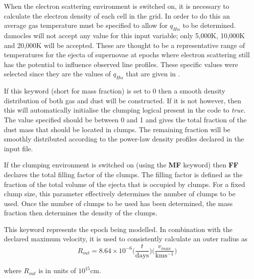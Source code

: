 
 When the electron scattering environment is switched on, it is necessary to calculate the electron density of each cell in the grid.  In order to do this an average gas temperature must be specified to allow for $q_{H\alpha}$ to be determined.  {\sc damocles} will not accept any value for this input variable; only 5,000K, 10,000K and 20,000K will be accepted.  These are thought to be a representative range of temperatures for the ejecta of supernovae at epochs where electron scattering still has the potential to influence observed line profiles.  These specific values were selected since they are the values of $q_{H\alpha}$ that are given in \citet{Osterbrock2006}.


 If this keyword (short for mass fraction) is set to 0 then a smooth density distribution of both gas and dust will be constructed.   If it is not however, then this will automatically initialise the clumping logical present in the code to \textit{true}.  The value specified should be between 0 and 1 and gives the total fraction of the dust mass that should be located in clumps.  The remaining fraction will be smoothly distributed according to the power-law density profiles declared in the input file.


 If the clumping environment is switched on (using the \textbf{MF} keyword) then \textbf{FF} declares the total filling factor of the clumps.  The filling factor is defined as the fraction of the total volume of the ejecta that is occupied by clumps.  For a fixed clump size, this parameter effectively determines the number of clumps to be used.  Once the number of clumps to be used has been determined, the mass fraction then determines the density of the clumps.
 

 This keyword represents the epoch being modelled.  In combination with the declared maximum velocity, it is used to consistently calculate an outer radius as 
 \begin{equation}
 R_{out}=8.64 \times 10^{-6} \Big( \frac{t}{\mathrm{days}} \Big) \Big( \frac{v_{max}}{\mathrm{kms^{-1}}} \Big)
 \label{eqn:Rout_calcn}
 \end{equation}

 \noindent where $R_{out}$ is in units of $10^{15}$cm.


